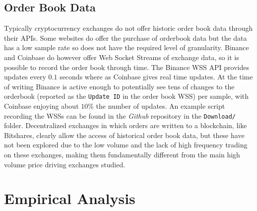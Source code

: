 \documentclass[a4paper,10pt]{article}
\begin{document}
\subsection{Order Book Data}
Typically cryptocurrency exchanges do not offer historic order book data through their APIs. Some websites do offer the purchase of orderbook data but the data has a low sample rate so does not have the required level of granularity. Binance and Coinbase do however offer Web Socket Streams of exchange data, so it is possible to record the order book through time. The Binance WSS API provides updates every $0.1$ seconds \cite{binancewss} where as Coinbase gives real time updates\cite{coinbase}. At the time of writing Binance is active enough to potentially see tens of changes to the orderbook (reported as the \texttt{Update ID} in the order book WSS) per sample, with Coinbase enjoying about $10\%$ the number of updates. An example script recording the WSSs can be found in the \emph{Github} repository in the \texttt{Download/} folder. Decentralized exchanges in which orders are written to a blockchain, like Bitshares, clearly allow the access of historical order book data, but these have not been explored due to the low volume and the lack of high frequency trading on these exchanges, making them fundamentally different from the main high volume price driving exchanges studied\cite{bitshares}. 
\section{Empirical Analysis}
\end{document}
